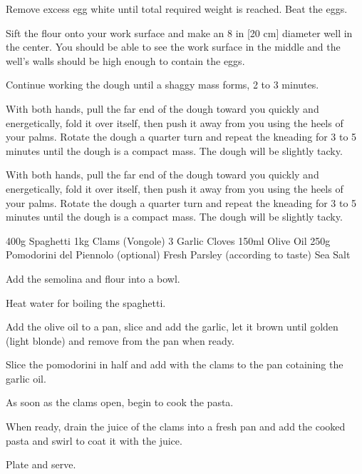 \begin{method}

	Remove excess egg white until total required weight is reached.  Beat the eggs.

	Sift the flour onto your work surface and make an 8 in [20 cm] diameter well in the center. 
	You should be able to see the work surface in the middle and the well’s walls should be high enough 
	to contain the eggs.

	Continue working the dough until a shaggy mass forms, 2 to 3 minutes.

	With both hands, pull the far end of the dough toward you quickly and energetically, fold it over itself, 
	then push it away from you using the heels of your palms. Rotate the dough a quarter turn and repeat the 
	kneading for 3 to 5 minutes until the dough is a compact mass. The dough will be slightly tacky.
	
	With both hands, pull the far end of the dough toward you quickly and energetically, fold it over itself, 
	then push it away from you using the heels of your palms. Rotate the dough a quarter turn and repeat 
	the kneading for 3 to 5 minutes until the dough is a compact mass. The dough will be slightly tacky.

\end{method}

\label{rec:pasta-spaghetti-vongole-napoli}

\begin{ingreds}
	400g Spaghetti
	1kg Clams (Vongole)
	3 Garlic Cloves
	150ml Olive Oil
	250g Pomodorini del Piennolo (optional)
	Fresh Parsley (according to taste)
	Sea Salt
\end{ingreds}

\begin{method}		
     	Add the semolina and flour into a bowl.

	Heat water for boiling the spaghetti.

	Add the olive oil to a pan, slice and add the garlic, let it brown until golden (light blonde) and remove from the pan when ready.

	Slice the pomodorini in half and add with the clams to the pan cotaining the garlic oil.

	As soon as the clams open, begin to cook the pasta.

	When ready, drain the juice of the clams into a fresh pan and add the cooked pasta and swirl to coat it with the juice.

	Plate and serve.

\end {method}




